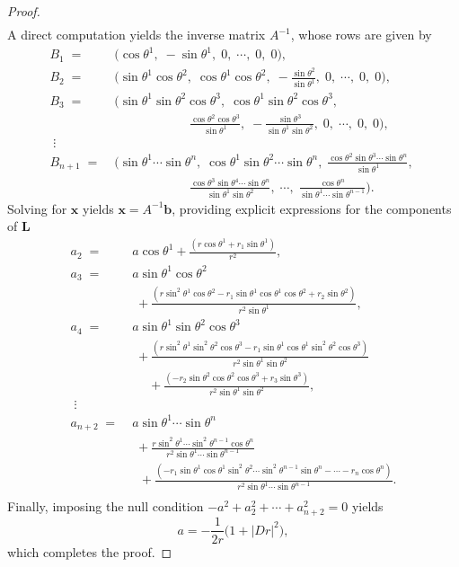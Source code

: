 \documentclass[10pt,a4paper]{amsart}
\begin{document}
\begin{proof}
\begin{align*}
     	\end{align*}
     	A direct computation yields the inverse matrix $A^{-1}$, whose rows are given by  
     	 \begin{align*}
     		B_1\;=\;&\Big(\cos\theta^1,\;-\sin\theta^1,\; 0,\; \cdots,\;  0,\; 0 \Big),\;\\
     		B_2\;=\;&\Big(\sin\theta^1\cos\theta^2,\;\cos\theta^1\cos\theta^2,\; -\frac{\sin\theta^2}{\sin\theta^1},\; 0,\; \cdots,\; 0,\; 0\Big),\;\\
     		B_3\;=\;&\Big(\sin\theta^1\sin\theta^2\cos\theta^3,\;\cos\theta^1\sin\theta^2\cos\theta^3,\;   \\
     		&\qquad\qquad\qquad \frac{\cos\theta^2\cos\theta^3}{\sin\theta^1},\; -\frac{\sin\theta^3}{\sin\theta^1\sin\theta^2},\;0,\;\cdots,\; 0,\;0 \Big),\;\\
     		\;\vdots&\\
     		B_{n+1}\;=\;&\Big(\sin\theta^1\cdots\sin\theta^n,\;\cos\theta^1\sin\theta^2\cdots\sin\theta^n,\;  \frac{\cos\theta^2\sin\theta^3\cdots\sin\theta^n}{\sin\theta^1},\; \\
     		&\qquad\qquad\qquad  \frac{\cos\theta^3\sin\theta^4\cdots\sin\theta^n}{\sin\theta^1\sin\theta^2},\;\cdots,\; \frac{\cos\theta^n}{\sin\theta^1\cdots\sin\theta^{n-1}} \Big).
     	\end{align*}
     	Solving for $\mathbf{x}$ yields $\mathbf{x} = A^{-1}\mathbf{b}$, providing explicit expressions for the components of $\mathbf{L}$
     	 \begin{align*}
     		a_2\;=\;&a\cos\theta^1+\frac{\left(r\cos\theta^1+r_1\sin\theta^1\right)}{r^2},\\
     		a_3\;=\;&a\sin\theta^1\cos\theta^2\\
     		&\;+\frac{\left(r\sin^2\theta^1\cos\theta^2-r_1\sin\theta^1\cos\theta^1\cos\theta^2+r_2\sin\theta^2\right)}{r^2\sin\theta^1},\\
     		a_4\;=\;&a\sin\theta^1\sin\theta^2\cos\theta^3\\
     		&\;+\frac{\left(r\sin^2\theta^1\sin^2\theta^2\cos\theta^3-r_1\sin\theta^1\cos\theta^1\sin^2\theta^2\cos\theta^3\right)}{r^2\sin\theta^1\sin\theta^2}\\
     		&\;\quad+\frac{\left(-r_2\sin\theta^2\cos\theta^2\cos\theta^3+r_3\sin\theta^3\right)}{r^2\sin\theta^1\sin\theta^2},\\
     		\;\vdots&\\
     		a_{n+2}\;=\;&a\sin\theta^1\cdots\sin\theta^n\\
     		&\;+\frac{r\sin^2\theta^1\cdots\sin^2\theta^{n-1}\cos\theta^n}{r^2\sin\theta^1\cdots\sin\theta^{n-1}}\\
     		&\;\;+\frac{\left(-r_1\sin\theta^1\cos\theta^1\sin^2\theta^2\cdots\sin^2\theta^{n-1}\sin\theta^n-\cdots-r_n\cos\theta^n\right)}{r^2\sin\theta^1\cdots\sin\theta^{n-1}}.\\
     	\end{align*}       	
     	Finally, imposing the null condition $-a^2 + a_2^2 + \cdots + a_{n+2}^2 = 0$ yields
     	\[
     	a = -\frac{1}{2r}\Big(1 + |Dr|^2\Big),
     	\]  
     	which completes the proof.
     \end{proof}
\end{document}
